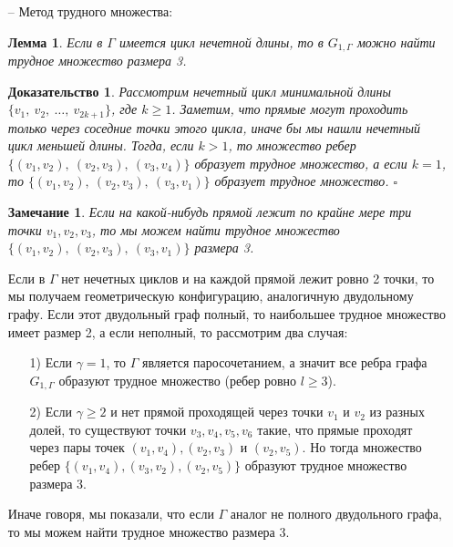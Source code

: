 \documentclass[a4paper]{article}
\newtheorem*{mremark}{Замечание}
\newtheorem*{mlemma}{Лемма}
\newtheorem*{msolution}{Доказательство}
\begin{document}
\begin{itemize}[noitemsep]
    \item[--] Метод трудного множества:
    \begin{mlemma}
        Если в $\Gamma$ имеется цикл нечетной длины, то в $G_{1, \Gamma}$ можно найти трудное множество 
        размера 3.
    \end{mlemma}
    \begin{msolution}
        Рассмотрим нечетный цикл минимальной длины $\{v_1,\ v_2,\ \ldots,\ v_{2k+1}\}$, где $k \geq 1$.
        Заметим, что прямые могут проходить только через соседние точки этого цикла, иначе бы мы нашли 
        нечетный цикл меньшей длины. Тогда, если $k > 1$, то множество ребер $\{(v_1, v_2),\ (v_2, v_3),
        \ (v_3, v_4)\}$ образует трудное множество, а если $k = 1$, то $\{(v_1, v_2),\ (v_2, v_3),
        \ (v_3, v_1)\}$ образует трудное множество. $\square$
    \end{msolution}
    
    \begin{mremark}
        Если на какой-нибудь прямой лежит по крайне мере три точки $v_1, v_2, v_3$, то мы можем найти 
        трудное множество $\{(v_1, v_2),\ (v_2, v_3),\ (v_3, v_1)\}$ размера 3.
    \end{mremark}

     Если  в $\Gamma$ нет нечетных циклов и на каждой прямой лежит ровно 2 точки, то мы получаем 
     геометрическую конфигурацию, аналогичную двудольному графу. Если этот двудольный граф полный, 
     то наибольшее трудное множество имеет размер 2, а если неполный, то рассмотрим два случая:
     \begin{itemize}
         \item[1)] Если $\gamma = 1$, то $\Gamma$ является паросочетанием, а значит все ребра графа 
         $G_{1,\Gamma}$ образуют трудное множество (ребер ровно $l \geq 3$).
         \item[2)] Если $\gamma \geq 2$ и нет прямой проходящей через точки $v_1$ и $v_2$ из разных долей, 
         то существуют точки $v_3, v_4, v_5, v_6$ такие, что прямые проходят через пары точек $(v_1, v_4), 
         (v_2, v_3)$ и $(v_2, v_5)$. Но тогда множество ребер $\{(v_1, v_4), (v_3, v_2), (v_2, v_5)\}$ 
         образуют трудное множество размера 3.
     \end{itemize}
     Иначе говоря, мы показали, что если $\Gamma$ аналог не полного двудольного графа, то мы можем 
     найти трудное множество размера 3. 


\end{itemize}
\end{document}
